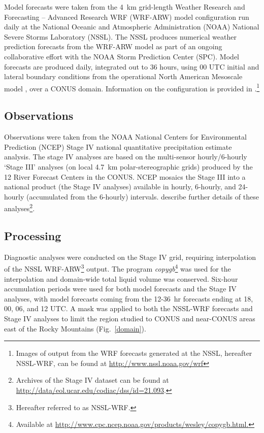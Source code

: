 Model forecasts were taken from the \mbox{4 km} grid-length Weather Research and Forecasting -- Advanced Research WRF (WRF-ARW) model configuration \citep{WRFV3} run daily at the National Oceanic and Atmospheric Administration (NOAA) National Severe Storms Laboratory (NSSL).
The NSSL produces numerical weather prediction forecasts from the WRF-ARW model as part of an ongoing collaborative effort with the NOAA Storm Prediction Center (SPC).
Model forecasts are produced daily, integrated out to 36 hours, using 00 UTC initial and lateral boundary conditions from the operational North American Mesoscale model \citep{NAMnWRF-NMM}, over a CONUS domain.
Information on the configuration is provided in \cite{Kain2010}.\footnote{Images of output from the WRF forecasts generated at the NSSL, hereafter NSSL-WRF, can be found at \url{http://www.nssl.noaa.gov/wrf}}




\subsection{Observations}
\label{observations}

Observations were taken from the NOAA National Centers for Environmental Prediction (NCEP) Stage IV national quantitative precipitation estimate analysis.
The stage IV analyses are based on the multi-sensor hourly/6-hourly `Stage III' analyses (on local \mbox{4.7 km} polar-stereographic grids) produced by the 12 River Forecast Centers in the CONUS.
NCEP mosaics the Stage III into a national product (the Stage IV analyses) available in hourly, 6-hourly, and 24-hourly (accumulated from the 6-hourly) intervals.
\cite{StageIV} describe further details of these analyses\footnote{Archives of the Stage IV dataset can be found at \url{http://data/eol.ucar.edu/codiac/dss/id=21.093}.}.




\subsection{Processing}
\label{dprocessing}

Diagnostic analyses were conducted on the Stage IV grid, requiring interpolation of the NSSL WRF-ARW\footnote{Hereafter referred to as NSSL-WRF.} output.
The program \emph{copygb}\footnote{Available at \url{http://www.cpc.ncep.noaa.gov/products/wesley/copygb.html.}} was used for the interpolation and domain-wide total liquid volume was conserved.
Six-hour accumulation periods were used for both model forecasts and the Stage IV analyses, with model forecasts coming from the \mbox{12-36 hr} forecasts ending at 18, 00, 06, and 12 UTC.
A mask was applied to both the NSSL-WRF forecasts and Stage IV analyses to limit the region studied to CONUS and near-CONUS areas east of the Rocky Mountains \mbox{(Fig. \ref{domain})}.


